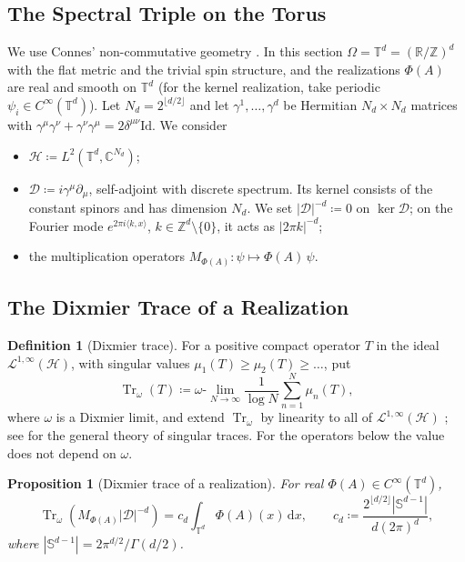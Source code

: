 \documentclass[11pt,a4paper,reqno]{amsart}
\newtheorem{proposition}[theorem]{Proposition}
\theoremstyle{definition}
\newtheorem{definition}[theorem]{Definition}
\numberwithin{equation}{section}
\newcommand{\R}{\mathbb{R}}
\newcommand{\C}{\mathbb{C}}
\newcommand{\Z}{\mathbb{Z}}
\newcommand{\Id}{\mathrm{Id}}
\newcommand{\Tr}{\operatorname{Tr}}
\newcommand{\dif}{\,\mathrm{d}}
\begin{document}
\subsection{The Spectral Triple on the Torus}
We use Connes' non-commutative geometry \cite{connes1994noncommutative}. In this section $\Omega = \mathbb{T}^d = (\R/\Z)^d$ with the flat metric and the trivial spin structure, and the realizations $\Phi(A)$ are real and smooth on $\mathbb{T}^d$ (for the kernel realization, take periodic $\psi_i \in C^\infty(\mathbb{T}^d)$). Let $N_d = 2^{\lfloor d/2 \rfloor}$ and let $\gamma^1, \dots, \gamma^d$ be Hermitian $N_d \times N_d$ matrices with $\gamma^\mu\gamma^\nu + \gamma^\nu\gamma^\mu = 2\delta^{\mu\nu}\Id$. We consider
\begin{itemize}
    \item $\mathcal{H} \coloneqq L^2(\mathbb{T}^d, \C^{N_d})$;
    \item $\mathcal{D} \coloneqq i \gamma^\mu \partial_\mu$, self-adjoint with discrete spectrum. Its kernel consists of the constant spinors and has dimension $N_d$. We set $|\mathcal{D}|^{-d} \coloneqq 0$ on $\ker \mathcal{D}$; on the Fourier mode $e^{2\pi i \langle k, x\rangle}$, $k \in \Z^d \setminus \{0\}$, it acts as $|2\pi k|^{-d}$;
    \item the multiplication operators $M_{\Phi(A)} \colon \psi \mapsto \Phi(A)\,\psi$.
\end{itemize}

\subsection{The Dixmier Trace of a Realization}
\begin{definition}[Dixmier trace]
For a positive compact operator $T$ in the ideal $\mathcal{L}^{1,\infty}(\mathcal{H})$, with singular values $\mu_1(T) \ge \mu_2(T) \ge \dots$, put
\begin{equation}
    \Tr_\omega(T) \coloneqq \omega\text{-}\lim_{N \to \infty} \frac{1}{\log N} \sum_{n=1}^N \mu_n(T),
\end{equation}
where $\omega$ is a Dixmier limit, and extend $\Tr_\omega$ by linearity to all of $\mathcal{L}^{1,\infty}(\mathcal{H})$ \cite[Ch.~IV, Sect.~2]{connes1994noncommutative}; see \cite{lord2013singular} for the general theory of singular traces. For the operators below the value does not depend on $\omega$.
\end{definition}

\begin{proposition}[Dixmier trace of a realization]
\label{thm:dixmier_integration}
For real $\Phi(A) \in C^\infty(\mathbb{T}^d)$,
\begin{equation}
    \Tr_\omega \left( M_{\Phi(A)} |\mathcal{D}|^{-d} \right) = c_d \int_{\mathbb{T}^d} \Phi(A)(x) \dif x, \qquad c_d \coloneqq \frac{2^{\lfloor d/2 \rfloor} |\mathbb{S}^{d-1}|}{d (2\pi)^d},
\end{equation}
where $|\mathbb{S}^{d-1}| = 2\pi^{d/2}/\Gamma(d/2)$.
\end{proposition}
\end{document}
